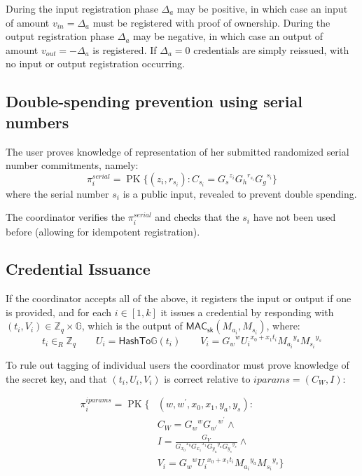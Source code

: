 \documentclass{article}
\begin{document}
During the input registration phase $\Delta_{a}$ may be positive, in which case an input of amount $v_{\mathit{in}} = \Delta_{a}$ must be registered with proof of ownership. During the output registration phase $\Delta_{a}$ may be negative, in which case an output of amount $v_{\mathit{out}} = -\Delta_{a}$ is registered. If $\Delta_{a} = 0$ credentials are simply reissued, with no input or output registration occurring.

\subsection{Double-spending prevention using serial numbers}

The user proves knowledge of representation of her submitted randomized serial number commitments, namely:
\[ \pi_{i}^{\mathit{serial}}=\operatorname{PK}\{ (z_i, r_{s_i}): C_{s_i} = {G_s}^{z_i}{G_h}^{r_{s_i}}{G_g}^{s_i} \} \]
where the serial number $s_i$ is a public input, revealed to prevent double spending.

The coordinator verifies the $\pi_{i}^{\mathit{serial}}$ and checks that the $s_i$ have not been used before (allowing for idempotent registration).

\subsection{Credential Issuance}

If the coordinator accepts all of the above, it registers the input or output if one is provided, and for each $i \in [1,k]$ it issues a credential by responding with
$(t_i, V_i) \in \mathbb{Z}_q \times \mathbb{G}$,
which is the output of
$\mathsf{MAC}_{\mathsf{sk}}(M_{a_i}, M_{s_i})$,
where:
\[
  t_i \in_{R} \mathbb{Z}_{q}
  \qquad
  U_i = \mathsf{HashTo\mathbb{G}}(t_i)
  \qquad
  V_i={G_w}^{w} {U_i}^{x_{0}+x_{1} t_i}{M_{a_i}}^{y_a} {M_{s_i}}^{y_s}
\]

To rule out tagging of individual users the coordinator must prove knowledge of the secret key, and that $(t_i, U_i, V_i)$ is correct relative to $\mathit{iparams}=(C_{W}, I)$:

\begin{align*}
\pi_{i}^{\mathit{iparams}}=\operatorname{PK}\{ & (w, w^{\prime}, x_{0}, x_{1}, y_a, y_s): \\
&C_{W}={G_{w}}^{w} {G_{w^{\prime}}}^{w^\prime} \land \\
&I=\frac{G_{V}}{{G_{x_{0}}}^{x_0} {G_{x_1}}^{x_1} {G_{y_a}}^{y_a} {G_{y_s}}^{y_s}} \land \\
&V_i={G_w}^{w}{U_i}^{x_{0}+x_{1}t_i} {M_{a_i}}^{y_a} {M_{s_i}}^{y_s}
\}
\end{align*}
\end{document}
